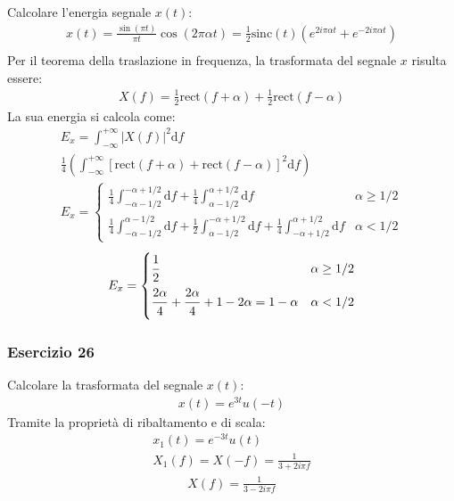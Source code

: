 \documentclass{article}
\newcommand{\rect}{\mathrm{rect}}
\newcommand{\sinc}{\mathrm{sinc}}
\newcommand{\df}{\mathrm{d}}
\begin{document}
Calcolare l'energia segnale $x(t)$:
\begin{gather*}
    x(t)=\displaystyle\frac{\sin(\pi t)}{\pi t}\cos(2\pi \alpha t)=\frac{1}{2}\sinc(t)(e^{2i\pi\alpha t}+e^{-2i\pi\alpha t})\\
\end{gather*}
Per il teorema della traslazione in frequenza, la trasformata del segnale $x$ risulta essere:
\begin{gather*}
    X(f)=\displaystyle\frac{1}{2}\rect(f+\alpha)+\frac{1}{2}\rect(f-\alpha)
\end{gather*}
La sua energia si calcola come:
\begin{gather*}
    E_x=\displaystyle\int_{-\infty}^{+\infty}|X(f)|^2\df f\\
    \displaystyle\frac{1}{4}\left(\int_{-\infty}^{+\infty}\left[\rect(f+\alpha)+\rect(f-\alpha)\right]^2\df f\right)\\
    E_x=\begin{cases}
        \displaystyle\frac{1}{4}\int_{-\alpha-1/2}^{-\alpha+1/2}\df f+\frac{1}{4}\int_{\alpha-1/2}^{\alpha+1/2}\df f& \alpha\geq1/2\\
        \displaystyle\frac{1}{4}\int_{-\alpha-1/2}^{\alpha-1/2}\df f+\frac{1}{2}\int_{\alpha-1/2}^{-\alpha+1/2}\df f+\frac{1}{4}\int_{-\alpha+1/2}^{\alpha+1/2}\df f&\alpha<1/2
    \end{cases}
\end{gather*}
\begin{gather}
    E_x=\begin{cases}
        \displaystyle\frac{\strut 1}{\strut 2}&\alpha\geq1/2\\
        \displaystyle\frac{\strut 2\alpha}{\strut 4}+\frac{\strut 2\alpha}{\strut 4}+1-2\alpha=1-\alpha&\alpha<1/2
    \end{cases}
\end{gather}

\subsubsection*{Esercizio 26}

Calcolare la trasformata del segnale $x(t)$: 
\begin{gather*}
    x(t)=e^{3t}u(-t)
\end{gather*}
Tramite la proprietà di ribaltamento e di scala: 
\begin{gather*}
    x_1(t)=e^{-3t}u(t)\\
    X_1(f)=X(-f)=\displaystyle\frac{1}{3+2i\pi f}
\end{gather*}
\begin{gather}
    X(f)=\displaystyle\frac{1}{3-2i\pi f}
\end{gather}
\end{document}
